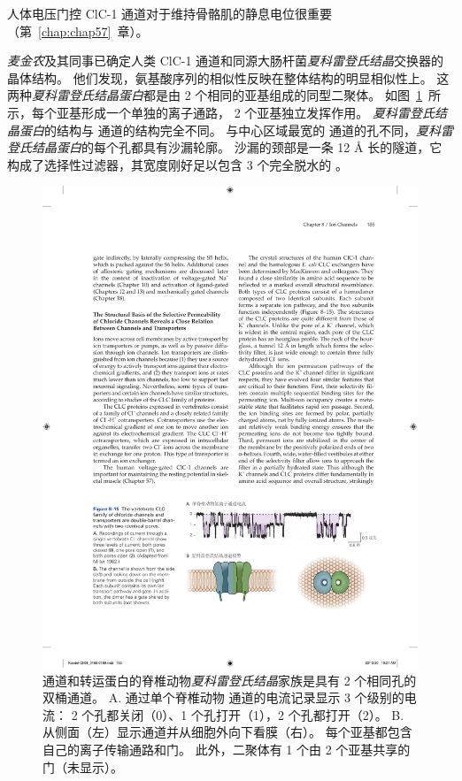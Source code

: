 人体电压门控 ClC-1 通道对于维持骨骼肌的静息电位很重要（第~\ref{chap:chap57}~章）。


\textit{麦金农}及其同事已确定人类 ClC-1 通道和同源大肠杆菌\textit{夏科雷登氏结晶}交换器的晶体结构。
他们发现，氨基酸序列的相似性反映在整体结构的明显相似性上。
这两种\textit{夏科雷登氏结晶蛋白}都是由 2 个相同的亚基组成的同型二聚体。
如图~\ref{fig:8_15}~所示，每个亚基形成一个单独的离子通路， 2 个亚基独立发挥作用。
\textit{夏科雷登氏结晶蛋白}的结构与  通道的结构完全不同。
与中心区域最宽的  通道的孔不同，\textit{夏科雷登氏结晶蛋白}的每个孔都具有沙漏轮廓。
沙漏的颈部是一条 12 Å 长的隧道，它构成了选择性过滤器，其宽度刚好足以包含 3 个完全脱水的 。


\begin{figure}[htbp]
	\centering
	\includegraphics[width=0.8\linewidth]{chap08/fig_8_15}
	\caption{ 通道和转运蛋白的脊椎动物\textit{夏科雷登氏结晶}家族是具有 2 个相同孔的双桶通道。
		A. 通过单个脊椎动物  通道的电流记录显示 3 个级别的电流：
		2 个孔都关闭（0）、1 个孔打开（1），2 个孔都打开（2）。
		B. 从侧面（左）显示通道并从细胞外向下看膜（右）。
		每个亚基都包含自己的离子传输通路和门。
		此外，二聚体有 1 个由 2 个亚基共享的门（未显示）。}
	\label{fig:8_15}
\end{figure}


